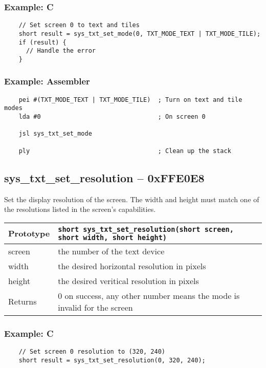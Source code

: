 \subsubsection*{Example: C}
\begin{lstlisting}
    // Set screen 0 to text and tiles
    short result = sys_txt_set_mode(0, TXT_MODE_TEXT | TXT_MODE_TILE);
    if (result) {
      // Handle the error
    }    
\end{lstlisting}

\subsubsection*{Example: Assembler}
\begin{verbatim}
    pei #(TXT_MODE_TEXT | TXT_MODE_TILE)  ; Turn on text and tile modes
    lda #0                                ; On screen 0
    
    jsl sys_txt_set_mode

    ply                                   ; Clean up the stack
\end{verbatim}

\subsection*{sys\_txt\_set\_resolution -- 0xFFE0E8}
Set the display resolution of the screen.
The width and height must match one of the resolutions listed in the screen's capabilities.

\bigskip

\begin{tabular}{|l||l|} \hline
Prototype & \lstinline!short sys_txt_set_resolution(short screen, short width, short height)! \\ \hline
screen & the number of the text device \\ \hline
width & the desired horizontal resolution in pixels \\ \hline
height & the desired veritical resolution in pixels \\ \hline
Returns & 0 on success, any other number means the mode is invalid for the screen \\ \hline
\end{tabular}

\subsubsection*{Example: C}
\begin{lstlisting}
    // Set screen 0 resolution to (320, 240)
    short result = sys_txt_set_resolution(0, 320, 240);
\end{lstlisting}

